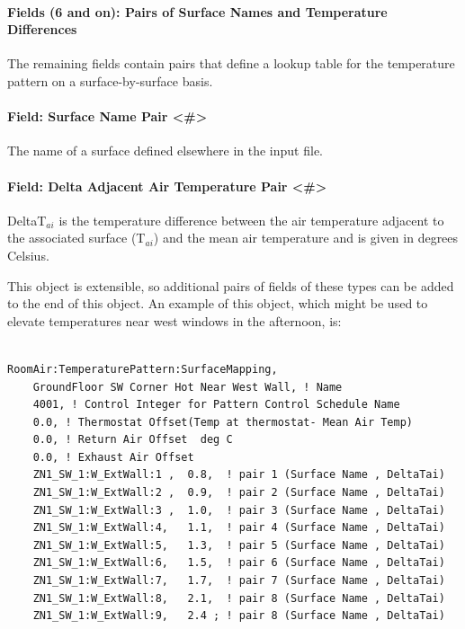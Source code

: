 \paragraph{Fields (6 and on): Pairs of Surface Names and Temperature Differences}\label{fields-6-and-on-pairs-of-surface-names-and-temperature-differences}

The remaining fields contain pairs that define a lookup table for the temperature pattern on a surface-by-surface basis.

\paragraph{Field: Surface Name Pair \textless{}\#\textgreater{}}\label{field-surface-name-pair}

The name of a surface defined elsewhere in the input file.

\paragraph{Field: Delta Adjacent Air Temperature Pair \textless{}\#\textgreater{}}\label{field-delta-adjacent-air-temperature-pair}

DeltaT\(_{ai}\) is the temperature difference between the air temperature adjacent to the associated surface (T\(_{ai}\)) and the mean air temperature and is given in degrees Celsius.

This object is extensible, so additional pairs of fields of these types can be added to the end of this object.  An example of this object, which might be used to elevate temperatures near west windows in the afternoon, is:

\begin{lstlisting}

RoomAir:TemperaturePattern:SurfaceMapping,
    GroundFloor SW Corner Hot Near West Wall, ! Name
    4001, ! Control Integer for Pattern Control Schedule Name
    0.0, ! Thermostat Offset(Temp at thermostat- Mean Air Temp)
    0.0, ! Return Air Offset  deg C
    0.0, ! Exhaust Air Offset
    ZN1_SW_1:W_ExtWall:1 ,  0.8,  ! pair 1 (Surface Name , DeltaTai)
    ZN1_SW_1:W_ExtWall:2 ,  0.9,  ! pair 2 (Surface Name , DeltaTai)
    ZN1_SW_1:W_ExtWall:3 ,  1.0,  ! pair 3 (Surface Name , DeltaTai)
    ZN1_SW_1:W_ExtWall:4,   1.1,  ! pair 4 (Surface Name , DeltaTai)
    ZN1_SW_1:W_ExtWall:5,   1.3,  ! pair 5 (Surface Name , DeltaTai)
    ZN1_SW_1:W_ExtWall:6,   1.5,  ! pair 6 (Surface Name , DeltaTai)
    ZN1_SW_1:W_ExtWall:7,   1.7,  ! pair 7 (Surface Name , DeltaTai)
    ZN1_SW_1:W_ExtWall:8,   2.1,  ! pair 8 (Surface Name , DeltaTai)
    ZN1_SW_1:W_ExtWall:9,   2.4 ; ! pair 8 (Surface Name , DeltaTai)
\end{lstlisting}

